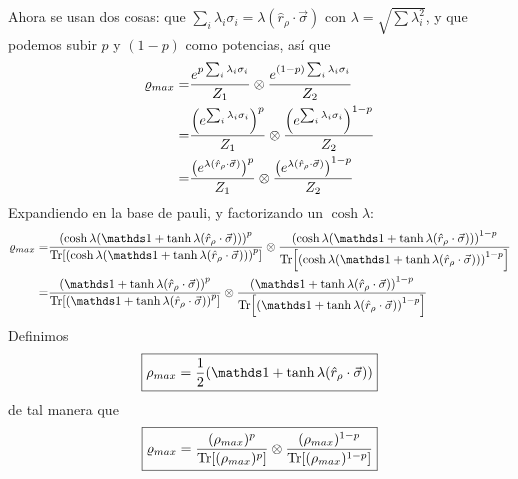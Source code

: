 Ahora se usan dos cosas: que $\sum_{i}\lambda_{i}\sigma_{i}=\lambda(\hat{r}_{\rho}\cdot\vec{\sigma})$ con $\lambda=\sqrt{\sum \lambda_{i}^{2}}$, y que podemos subir $p$ y $(1-p)$ como potencias, así que
\begin{align*}
  \varrho_{max}=&\frac{e^{p\sum_{i}\lambda_{i}\sigma_{i}}}{Z_{1}} \otimes \frac{e^{(1-p)\sum_{i}\lambda_{i}\sigma_{i}}}{Z_{2}}\\
  =&\frac{\qty(e^{\sum_{i}\lambda_{i}\sigma_{i}})^{p} }{Z_{1}}\otimes \frac{\qty(e^{\sum_{i}\lambda_{i}\sigma_{i}})^{1-p}}{Z_{2}}\\
  =&\frac{\qty(e^{\lambda(\hat{r}_{\rho}\cdot\vec{\sigma})})^{p}}{Z_{1}} \otimes \frac{\qty(e^{\lambda(\hat{r}_{\rho}\cdot\vec{\sigma})})^{1-p}}{Z_{2}}\\
\end{align*}
Expandiendo en la base de pauli, y factorizando un $\cosh{\lambda}$:
\begin{align*}
  \varrho_{max}=&\frac{\qty(\cosh{\lambda}(\Id+\tanh{\lambda}(\hat{r}_{\rho}\cdot\vec{\sigma})))^{p}}{\Tr[\qty(\cosh{\lambda}(\Id+\tanh{\lambda}(\hat{r}_{\rho}\cdot\vec{\sigma})))^{p}]} \otimes \frac{\qty(\cosh{\lambda}(\Id+\tanh{\lambda}(\hat{r}_{\rho}\cdot\vec{\sigma})))^{1-p}}{\Tr[\qty(\cosh{\lambda}(\Id+\tanh{\lambda}(\hat{r}_{\rho}\cdot\vec{\sigma})))^{1-p}]}\\
  =&\frac{\qty(\Id+\tanh{\lambda}(\hat{r}_{\rho}\cdot\vec{\sigma}))^{p}}{\Tr[\qty(\Id+\tanh{\lambda}(\hat{r}_{\rho}\cdot\vec{\sigma}))^{p}]} \otimes \frac{\qty(\Id+\tanh{\lambda}(\hat{r}_{\rho}\cdot\vec{\sigma}))^{1-p}}{\Tr[\qty(\Id+\tanh{\lambda}(\hat{r}_{\rho}\cdot\vec{\sigma}))^{1-p}]}
\end{align*}
Definimos
\begin{equation}
  \boxed{\rho_{max}=\frac{1}{2}(\Id+\tanh{\lambda}(\hat{r}_{\rho}\cdot\vec{\sigma}))}
\end{equation}
de tal manera que 
\begin{equation}\label{eq:MaxEntSeparableLM}
  \boxed{\varrho_{max}=\frac{(\rho_{max})^{p}}{\Tr[ (\rho_{max})^{p}]}\otimes\frac{(\rho_{max})^{1-p}}{\Tr[(\rho_{max})^{1-p}]}}
\end{equation}

